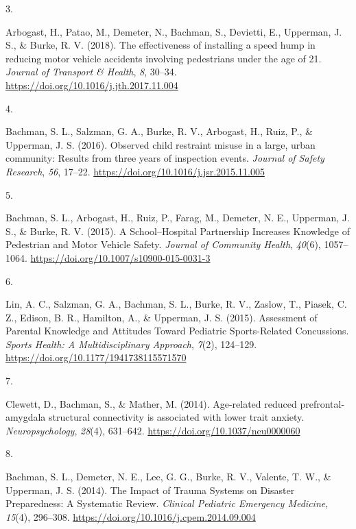 \documentclass[11pt, a4paper]{awesome-cv}
\newlength{\csllabelwidth}
\newcommand{\CSLLeftMargin}[1]{\parbox[t]{\csllabelwidth}{#1}}
\newcommand{\CSLRightInline}[1]{\parbox[t]{\linewidth - \csllabelwidth}{#1}}
\begin{document}
\leavevmode\hypertarget{ref-arbogast_effectiveness_2018}{}%
\CSLLeftMargin{3. }
\CSLRightInline{Arbogast, H., Patao, M., Demeter, N., Bachman, S.,
Devietti, E., Upperman, J. S., \& Burke, R. V. (2018). The effectiveness
of installing a speed hump in reducing motor vehicle accidents involving
pedestrians under the age of 21. \emph{Journal of Transport \& Health},
\emph{8}, 30--34. \url{https://doi.org/10.1016/j.jth.2017.11.004}}

\leavevmode\hypertarget{ref-bachman_observed_2016}{}%
\CSLLeftMargin{4. }
\CSLRightInline{Bachman, S. L., Salzman, G. A., Burke, R. V., Arbogast,
H., Ruiz, P., \& Upperman, J. S. (2016). Observed child restraint misuse
in a large, urban community: Results from three years of inspection
events. \emph{Journal of Safety Research}, \emph{56}, 17--22.
\url{https://doi.org/10.1016/j.jsr.2015.11.005}}

\leavevmode\hypertarget{ref-bachman_schoolhospital_2015}{}%
\CSLLeftMargin{5. }
\CSLRightInline{Bachman, S. L., Arbogast, H., Ruiz, P., Farag, M.,
Demeter, N. E., Upperman, J. S., \& Burke, R. V. (2015). A
School--Hospital Partnership Increases Knowledge of Pedestrian and Motor
Vehicle Safety. \emph{Journal of Community Health}, \emph{40}(6),
1057--1064. \url{https://doi.org/10.1007/s10900-015-0031-3}}

\leavevmode\hypertarget{ref-lin_assessment_2015}{}%
\CSLLeftMargin{6. }
\CSLRightInline{Lin, A. C., Salzman, G. A., Bachman, S. L., Burke, R.
V., Zaslow, T., Piasek, C. Z., Edison, B. R., Hamilton, A., \& Upperman,
J. S. (2015). Assessment of Parental Knowledge and Attitudes Toward
Pediatric Sports-Related Concussions. \emph{Sports Health: A
Multidisciplinary Approach}, \emph{7}(2), 124--129.
\url{https://doi.org/10.1177/1941738115571570}}

\leavevmode\hypertarget{ref-clewett_age-related_2014}{}%
\CSLLeftMargin{7. }
\CSLRightInline{Clewett, D., Bachman, S., \& Mather, M. (2014).
Age-related reduced prefrontal-amygdala structural connectivity is
associated with lower trait anxiety. \emph{Neuropsychology},
\emph{28}(4), 631--642. \url{https://doi.org/10.1037/neu0000060}}

\leavevmode\hypertarget{ref-bachman_impact_2014}{}%
\CSLLeftMargin{8. }
\CSLRightInline{Bachman, S. L., Demeter, N. E., Lee, G. G., Burke, R.
V., Valente, T. W., \& Upperman, J. S. (2014). The Impact of Trauma
Systems on Disaster Preparedness: A Systematic Review. \emph{Clinical
Pediatric Emergency Medicine}, \emph{15}(4), 296--308.
\url{https://doi.org/10.1016/j.cpem.2014.09.004}}
\end{document}
